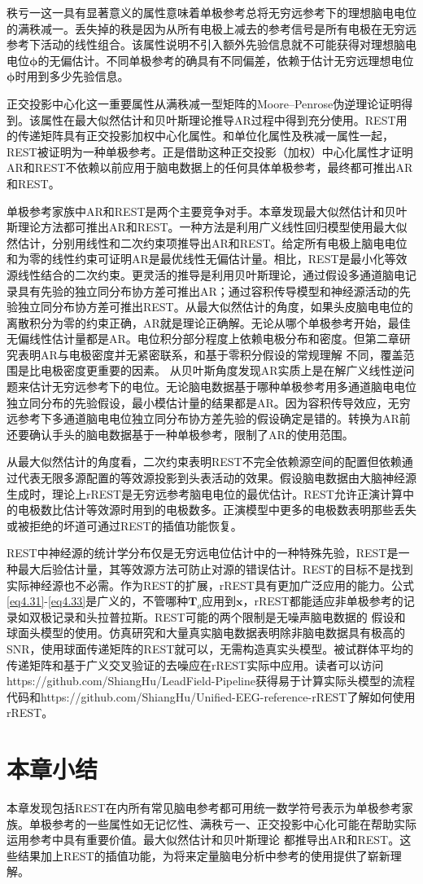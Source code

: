 秩亏一这一具有显著意义的属性意味着单极参考总将无穷远参考下的理想脑电电位的满秩减一。丢失掉的秩是因为从所有电极上减去的参考信号是所有电极在无穷远参考下活动的线性组合。该属性说明不引入额外先验信息就不可能获得对理想脑电电位$\mathbf{\phi}$的无偏估计。不同单极参考的确具有不同偏差，依赖于估计无穷远理想电位$\mathbf{\phi}$时用到多少先验信息。

正交投影中心化这一重要属性从满秩减一型矩阵的Moore–Penrose伪逆理论证明得到。该属性在最大似然估计和贝叶斯理论推导AR过程中得到充分使用。REST用的传递矩阵具有正交投影加权中心化属性。和单位化属性及秩减一属性一起，REST被证明为一种单极参考。正是借助这种正交投影（加权）中心化属性才证明AR和REST不依赖以前应用于脑电数据上的任何具体单极参考，最终都可推出AR和REST。

单极参考家族中AR和REST是两个主要竞争对手。本章发现最大似然估计和贝叶斯理论方法都可推出AR和REST。一种方法是利用广义线性回归模型使用最大似然估计，分别用线性和二次约束项推导出AR和REST。给定所有电极上脑电电位和为零的线性约束可证明AR是最优线性无偏估计量。相比，REST是最小化等效源线性结合的二次约束。更灵活的推导是利用贝叶斯理论，通过假设多通道脑电记录具有先验的独立同分布协方差可推出AR；通过容积传导模型和神经源活动的先验独立同分布协方差可推出REST。从最大似然估计的角度，如果头皮脑电电位的离散积分为零的约束正确，AR就是理论正确解。无论从哪个单极参考开始，最佳无偏线性估计量都是AR。电位积分部分程度上依赖电极分布和密度。但第二章研究表明AR与电极密度并无紧密联系，和基于零积分假设的常规理解
不同，覆盖范围是比电极密度更重要的因素。 从贝叶斯角度发现AR实质上是在解广义线性逆问题来估计无穷远参考下的电位。无论脑电数据基于哪种单极参考用多通道脑电电位独立同分布的先验假设，最小模估计量的结果都是AR。因为容积传导效应，无穷远参考下多通道脑电电位独立同分布协方差先验的假设确定是错的。转换为AR前还要确认手头的脑电数据基于一种单极参考，限制了AR的使用范围。

从最大似然估计的角度看，二次约束表明REST不完全依赖源空间的配置但依赖通过代表无限多源配置的等效源投影到头表活动的效果。假设脑电数据由大脑神经源生成时，理论上rREST是无穷远参考脑电电位的最优估计。REST允许正演计算中的电极数比估计等效源时用到的电极数多。正演模型中更多的电极数表明那些丢失或被拒绝的坏道可通过REST的插值功能恢复。

REST中神经源的统计学分布仅是无穷远电位估计中的一种特殊先验，REST是一种最大后验估计量，其等效源方法可防止对源的错误估计。REST的目标不是找到实际神经源也不必需。作为REST的扩展，rREST具有更加广泛应用的能力。公式\eqref{eq4.31}-\eqref{eq4.33}是广义的，不管哪种$\mathbf{T}_o$应用到$\mathbf{x}$，rREST都能适应非单极参考的记录如双极记录和头拉普拉斯。REST可能的两个限制是无噪声脑电数据的
假设和球面头模型的使用。仿真研究和大量真实脑电数据表明除非脑电数据具有极高的SNR，使用球面传递矩阵的REST就可以，无需构造真实头模型。被试群体平均的传递矩阵和基于广义交叉验证的去噪应在rREST实际中应用。读者可以访问https://github.com/ShiangHu/LeadField-Pipeline获得易于计算实际头模型的流程代码和https://github.com/ShiangHu/Unified-EEG-reference-rREST了解如何使用rREST。
\section{本章小结}
本章发现包括REST在内所有常见脑电参考都可用统一数学符号表示为单极参考家族。单极参考的一些属性如无记忆性、满秩亏一、正交投影中心化可能在帮助实际运用参考中具有重要价值。最大似然估计和贝叶斯理论
都推导出AR和REST。这些结果加上REST的插值功能，为将来定量脑电分析中参考的使用提供了崭新理解。